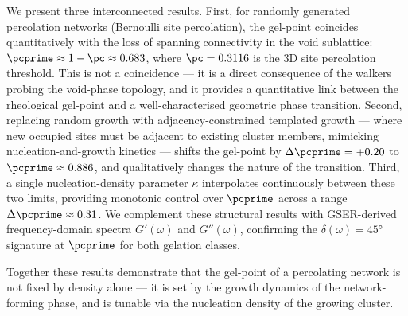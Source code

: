 We present three interconnected results. First, for randomly generated percolation networks (Bernoulli site percolation), the gel-point coincides quantitatively with the loss of spanning connectivity in the void sublattice: $\pcprime \approx 1 - \pc \approx 0.683$, where $\pc = 0.3116$ is the 3D site percolation threshold. This is not a coincidence — it is a direct consequence of the walkers probing the void-phase topology, and it provides a quantitative link between the rheological gel-point and a well-characterised geometric phase transition. Second, replacing random growth with adjacency-constrained templated growth — where new occupied sites must be adjacent to existing cluster members, mimicking nucleation-and-growth kinetics — shifts the gel-point by $\Delta\pcprime = +0.20$ to $\pcprime \approx 0.886$, and qualitatively changes the nature of the transition. Third, a single nucleation-density parameter $\kappa$ interpolates continuously between these two limits, providing monotonic control over $\pcprime$ across a range $\Delta\pcprime \approx 0.31$. We complement these structural results with GSER-derived frequency-domain spectra $G'(\omega)$ and $G''(\omega)$, confirming the $\delta(\omega) = 45°$ signature at $\pcprime$ for both gelation classes.

Together these results demonstrate that the gel-point of a percolating network is not fixed by density alone — it is set by the growth dynamics of the network-forming phase, and is tunable via the nucleation density of the growing cluster.

